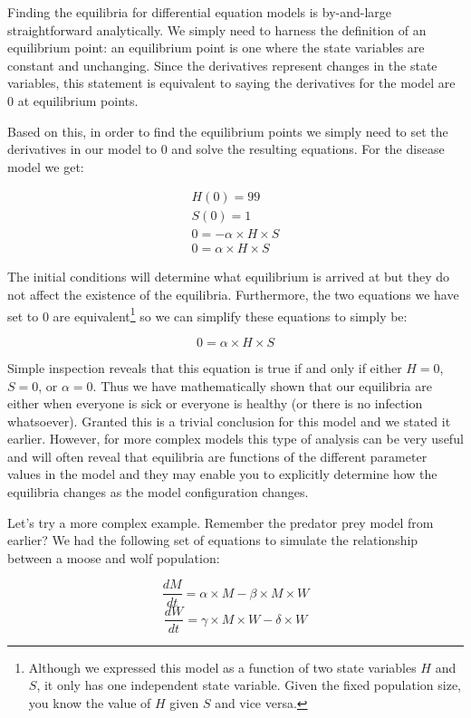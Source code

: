 \documentclass[]{memoir}
\begin{document}
Finding the equilibria for differential equation models is by-and-large
straightforward analytically. We simply need to harness the definition
of an equilibrium point: an equilibrium point is one where the state
variables are constant and unchanging. Since the derivatives represent
changes in the state variables, this statement is equivalent to saying
the derivatives for the model are 0 at equilibrium points.

Based on this, in order to find the equilibrium points we simply need to
set the derivatives in our model to 0 and solve the resulting equations.
For the disease model we get:

\[
\begin{aligned}
H(0) = 99 \\
S(0) = 1 \\
0 = - \alpha \times H \times S \\ 
0 = \alpha \times H \times S
\end{aligned}
\]

The initial conditions will determine what equilibrium is arrived at but
they do not affect the existence of the equilibria. Furthermore, the two
equations we have set to 0 are equivalent\footnote{Although we expressed
  this model as a function of two state variables $H$ and $S$, it only
  has one independent state variable. Given the fixed population size,
  you know the value of $H$ given $S$ and vice versa.} so we can
simplify these equations to simply be:

\[ 
0 = \alpha \times H \times S
\]

Simple inspection reveals that this equation is true if and only if
either $H=0$, $S=0$, or $\alpha=0$. Thus we have mathematically shown
that our equilibria are either when everyone is sick or everyone is
healthy (or there is no infection whatsoever). Granted this is a trivial
conclusion for this model and we stated it earlier. However, for more
complex models this type of analysis can be very useful and will often
reveal that equilibria are functions of the different parameter values
in the model and they may enable you to explicitly determine how the
equilibria changes as the model configuration changes.

Let's try a more complex example. Remember the predator prey model from
earlier? We had the following set of equations to simulate the
relationship between a moose and wolf population:

\[ \frac{dM}{dt} = \alpha \times M - \beta \times M \times W \]
\[ \frac{dW}{dt} = \gamma \times M \times W - \delta \times W  \]
\end{document}
